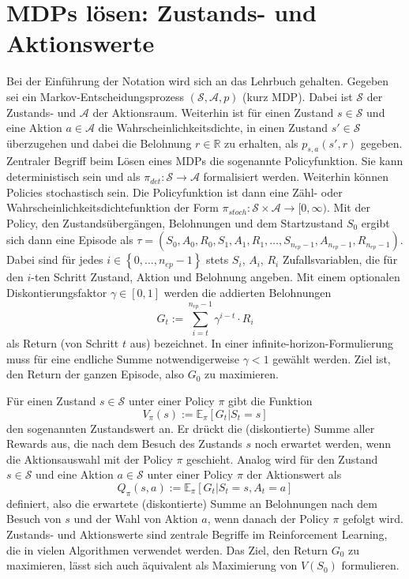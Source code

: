 \section{MDPs lösen: Zustands- und Aktionswerte}
\label{section:mdp_fundamentals}
Bei der Einführung der Notation wird sich an das Lehrbuch \cite{Sutton1998} gehalten.
Gegeben sei ein Markov-Entscheidungsprozess $(\mathcal{S}, \mathcal{A}, p)$ (kurz MDP).
Dabei ist $\mathcal{S}$ der Zustands- und $\mathcal{A}$ der Aktionsraum.
Weiterhin ist für einen Zustand $s\in \mathcal{S}$ und eine Aktion $a \in \mathcal{A}$ die Wahrscheinlichkeitsdichte, in einen Zustand $s' \in \mathcal{S}$ überzugehen und dabei die Belohnung $r \in \mathbb{R}$ zu erhalten, als $p_{s,a}(s', r)$ gegeben.
Zentraler Begriff beim Lösen eines MDPs die sogenannte Policyfunktion.
Sie kann deterministisch sein und als $\pi_{det}: \mathcal{S} \rightarrow \mathcal{A}$ formalisiert werden.
Weiterhin können Policies stochastisch sein.
Die Policyfunktion ist dann eine Zähl- oder Wahrscheinlichkeitsdichtefunktion der Form $\pi_{stoch}: \mathcal{S}\times\mathcal{A}\rightarrow [0, \infty)$.
Mit der Policy, den Zustandsübergängen, Belohnungen und dem Startzustand $S_0$ ergibt sich dann eine Episode als $\tau = \left(S_0, A_0, R_0, S_1, A_1, R_1, \dots, S_{n_{ep} - 1}, A_{n_{ep} - 1}, R_{n_{ep} - 1}\right)$.
Dabei sind für jedes $i \in \left\lbrace0, \dots, n_{ep} - 1\right\rbrace$ stets $S_i$, $A_i$, $R_i$ Zufallsvariablen, die für den $i$-ten Schritt Zustand, Aktion und Belohnung angeben.
Mit einem optionalen Diskontierungsfaktor $\gamma \in [0, 1]$ werden die addierten Belohnungen
\begin{equation}
	G_t := \sum_{i=t}^{n_{ep} - 1} \gamma^{i - t} \cdot R_i
\end{equation}
als Return (von Schritt $t$ aus) bezeichnet.
In einer infinite-horizon-Formulierung muss für eine endliche Summe notwendigerweise $\gamma < 1$ gewählt werden.
Ziel ist, den Return der ganzen Episode, also $G_0$ zu maximieren.

Für einen Zustand $s \in \mathcal{S}$ unter einer Policy $\pi$ gibt die Funktion
\begin{equation}
	V_\pi(s) := \mathbb{E}_\pi\left[G_t | S_t = s\right]
\end{equation}
den sogenannten Zustandswert an.
Er drückt die (diskontierte) Summe aller Rewards aus, die nach dem Besuch des Zustands $s$ noch erwartet werden, wenn die Aktionsauswahl mit der Policy $\pi$ geschieht.
Analog wird für den Zustand $s \in \mathcal{S}$ und eine Aktion $a \in \mathcal{S}$ unter einer Policy $\pi$ der Aktionswert als
\begin{equation}
	Q_\pi(s, a) := \mathbb{E}_\pi\left[G_t | S_t = s, A_t = a\right]
\end{equation}
definiert, also die erwartete (diskontierte) Summe an Belohnungen nach dem Besuch von $s$ und der Wahl von Aktion $a$, wenn danach der Policy $\pi$ gefolgt wird.
Zustands- und Aktionswerte sind zentrale Begriffe im Reinforcement Learning, die in vielen Algorithmen verwendet werden.
Das Ziel, den Return $G_0$ zu maximieren, lässt sich auch äquivalent als Maximierung von $V(S_0)$ formulieren.

